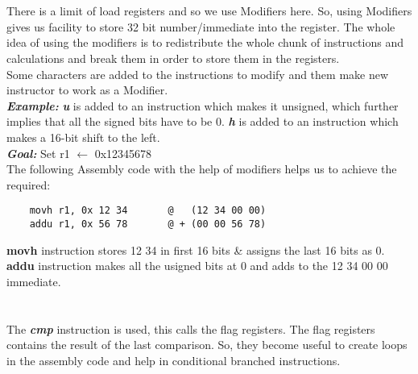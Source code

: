 \documentclass[12pt]{article}
\begin{document}
\maketitle

\section{}
There is a limit of load registers and so we use Modifiers here. So, using Modifiers gives us facility to store 32 bit number/immediate into the register. The whole idea of using the modifiers is to redistribute the whole chunk of instructions and calculations and break them in order to store them in the registers. \\

Some characters are added to the instructions to modify and them make new instructor to work as a Modifier.\\

\textbf{\textit{Example:}} \textbf{\textit{u}} is added to an instruction which makes it unsigned, which further implies that all the signed bits have to be 0. \textbf{\textit{h}} is added to an instruction which makes a 16-bit shift to the left. \\




\textbf{\textit{Goal:}} Set r1 $\leftarrow$ 0x12345678 \\

The following Assembly code with the help of modifiers helps us to achieve the required: \\
\begin{verbatim}
    movh r1, 0x 12 34       @   (12 34 00 00)
    addu r1, 0x 56 78       @ + (00 00 56 78)
\end{verbatim}
\textbf{movh} instruction stores 12 34 in first 16 bits \& assigns the last 16 bits as 0. \textbf{addu} instruction makes all the usigned bits at 0 and adds to the 12 34 00 00 immediate.


\section{}
The \textbf{\textit{cmp}} instruction is used, this calls the flag registers.
The flag registers contains the result of the last comparison. So, they become useful to create loops in the assembly code and help in conditional branched instructions. \\
\end{document}
